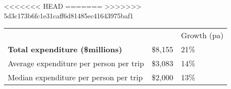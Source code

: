 <<<<<<< HEAD
=======
>>>>>>> 5d3c173b6fc1e31caff6d81485ec41643975baf1
\begin{tabular}[t]{p{4.85cm}>{\hfill}p{1.3cm}>{\hfill}p{1.35cm}}
    &   & Growth (pa) \\ 
 \textbf{Total expenditure (\$millions)} & \$8,155 & 21\% \\ 
  Average expenditure per person per trip & \$3,083 & 14\% \\ 
  Median expenditure per person per trip & \$2,000 & 13\% \\ 
  \end{tabular}
